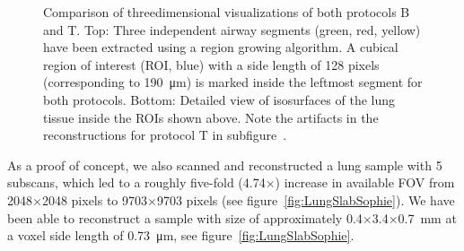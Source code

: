 \begin{figure}[htp]
{%
		}%
	\caption{Comparison of threedimensional visualizations of both protocols B and T. Top: Three independent airway segments (green, red, yellow) have been extracted using a region growing algorithm. A cubical region of interest (ROI, blue) with a side length of 128 pixels (corresponding to \SI{190}{\micro\meter}) is marked inside the leftmost segment for both protocols. Bottom: Detailed view of isosurfaces of the lung tissue inside the ROIs shown above. Note the artifacts in the reconstructions for protocol T in subfigure~.}
	\label{fig:BvsT2}
\end{figure}
\cbend

As a proof of concept, we also scanned and reconstructed a lung sample with 5 subscans, which led to a roughly five-fold (4.74\(\times\)) increase in available FOV from 2048\(\times\)2048 pixels to 9703\(\times\)9703 pixels (see figure~\ref{fig:LungSlabSophie}). We have been able to reconstruct a sample with size of approximately 0.4\(\times\)3.4\(\times\)\SI{0.7}{\milli\meter} at a voxel side length of \SI{0.73}{\micro\meter}, see figure~\ref{fig:LungSlabSophie}.

